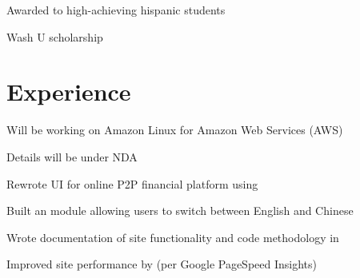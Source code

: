 \documentclass[]{deedy-resume-openfont}
\begin{document}
\begin{minipage}[t]{0.33\textwidth}
\begin{tightemize}
\item Awarded to high-achieving hispanic students
\end{tightemize}

\begin{tightemize}
\item Wash U scholarship
\end{tightemize}

\sectionsep

%
%

\end{minipage}
\hfill
\begin{minipage}[t]{0.66\textwidth}


\section{Experience}

\vspace{\topsep} %
\begin{tightemize}
\item Will be working on Amazon Linux for Amazon Web Services (AWS)
\item Details will be under NDA
\end{tightemize}
\sectionsep

\begin{tightemize}
\item Rewrote UI for online P2P financial platform using 
\item Built an  module allowing users to switch between English and Chinese
\item Wrote documentation of site functionality and code methodology in 
\item Improved site performance by  (per Google PageSpeed Insights)
\end{tightemize}
\sectionsep


\end{minipage}
\end{document}
